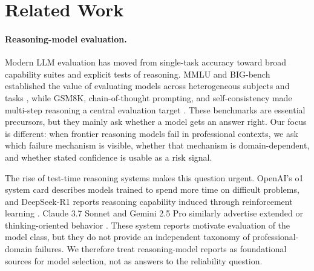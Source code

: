 \section{Related Work}
\label{sec:related-work}

\paragraph{Reasoning-model evaluation.}
Modern LLM evaluation has moved from single-task accuracy toward broad capability suites and explicit tests of reasoning. MMLU and BIG-bench established the value of evaluating models across heterogeneous subjects and tasks \citep{hendrycks2021mmlu,srivastava2023bigbench}, while GSM8K, chain-of-thought prompting, and self-consistency made multi-step reasoning a central evaluation target \citep{cobbe2021gsm8k,wei2022cot,wang2023selfconsistency}. These benchmarks are essential precursors, but they mainly ask whether a model gets an answer right. Our focus is different: when frontier reasoning models fail in professional contexts, we ask which failure mechanism is visible, whether that mechanism is domain-dependent, and whether stated confidence is usable as a risk signal.

The rise of test-time reasoning systems makes this question urgent. OpenAI's o1 system card describes models trained to spend more time on difficult problems, and DeepSeek-R1 reports reasoning capability induced through reinforcement learning \citep{openai2024o1,guo2025deepseekr1}. Claude 3.7 Sonnet and Gemini 2.5 Pro similarly advertise extended or thinking-oriented behavior \citep{anthropic2025claude37,google2025gemini25}. These system reports motivate evaluation of the model class, but they do not provide an independent taxonomy of professional-domain failures. We therefore treat reasoning-model reports as foundational sources for model selection, not as answers to the reliability question.


